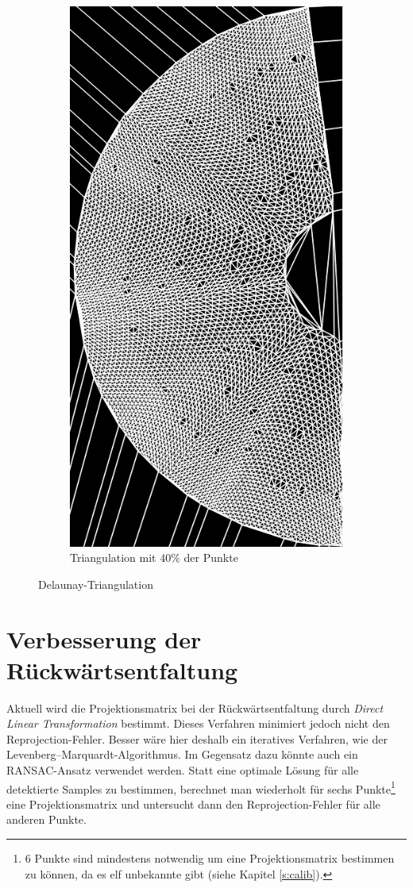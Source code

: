 \begin{figure}[!htb]
\begin{subfigure}{.9\textwidth}
		\includegraphics[angle=-90, width=.8\textwidth]{images/delaunay2.png}
		\caption{Triangulation mit $40\%$ der Punkte}
	\end{subfigure}
	\caption{Delaunay-Triangulation}
	\label{fig:delaunayTriag}
\end{figure}



\section{Verbesserung der Rückwärtsentfaltung}
Aktuell wird die Projektionsmatrix bei der Rückwärtsentfaltung durch \textit{Direct Linear Transformation} bestimmt. Dieses Verfahren minimiert jedoch nicht den Reprojection-Fehler. Besser wäre hier deshalb ein iteratives Verfahren, wie der Levenberg–Marquardt-Algorithmus. 
Im Gegensatz dazu könnte auch ein RANSAC-Ansatz verwendet werden. Statt eine optimale Lösung für alle detektierte Samples zu bestimmen, berechnet man wiederholt für sechs Punkte\footnote{6 Punkte sind mindestens notwendig um eine Projektionsmatrix bestimmen zu können, da es elf unbekannte gibt (siehe Kapitel \ref{s:calib}).} eine Projektionsmatrix und untersucht dann den Reprojection-Fehler für alle anderen Punkte. 



